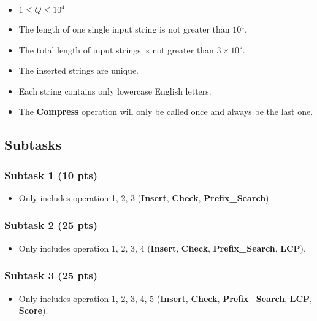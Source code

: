 \begin{itemize}
    \item $1 \leq Q \leq 10^4$
    \item The length of one single input string is not greater than $10^4$.
    \item The total length of input strings is not greater than $3 \times 10^5$.
    \item The inserted strings are unique.
    \item Each string contains only lowercase English letters.
    \item The \textbf{Compress} operation will only be called once and always be the last one.
\end{itemize}

\subsection{Subtasks}

\subsubsection{Subtask 1 (10 pts)}

\begin{itemize}
    \item Only includes operation 1, 2, 3 (\textbf{Insert}, \textbf{Check}, \textbf{Prefix\_Search}).
\end{itemize}

\subsubsection{Subtask 2 (25 pts)}

\begin{itemize}
    \item Only includes operation 1, 2, 3, 4 (\textbf{Insert}, \textbf{Check}, \textbf{Prefix\_Search}, \textbf{LCP}).
\end{itemize}

\subsubsection{Subtask 3 (25 pts)}

\begin{itemize}
    \item Only includes operation 1, 2, 3, 4, 5 (\textbf{Insert}, \textbf{Check}, \textbf{Prefix\_Search}, \textbf{LCP},  \textbf{Score}).
\end{itemize}

